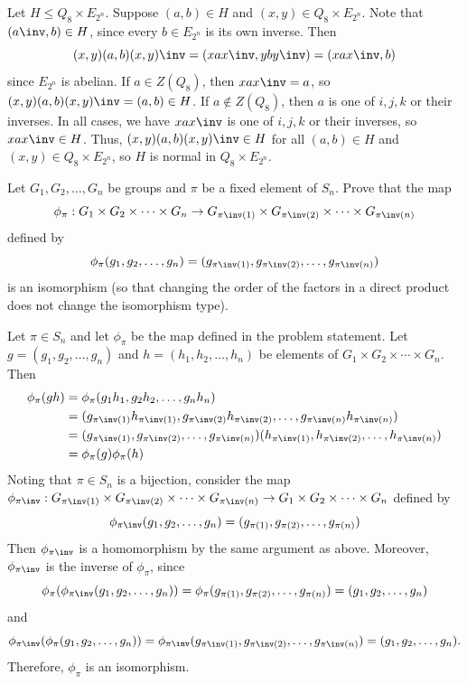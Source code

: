\begin{sol}
    Let $H \leq Q_8 \times E_{2^n}$. Suppose $(a, b) \in H$ and $(x, y) \in Q_8 \times E_{2^n}$. Note that $(a\inv, b) \in H$, since every $b \in E_{2^n}$ is its own inverse. Then
    \[(x, y)(a, b)(x, y)\inv = (xax\inv, yby\inv) = (xax\inv, b)\]
    since $E_{2^n}$ is abelian. If $a \in Z(Q_8)$, then $xax\inv = a$, so $(x, y)(a, b)(x, y)\inv = (a, b) \in H$. If $a \notin Z(Q_8)$, then $a$ is one of $i, j, k$ or their inverses. In all cases, we have $xax\inv$ is one of $i, j, k$ or their inverses, so $xax\inv \in H$. Thus, $(x, y)(a, b)(x, y)\inv \in H$ for all $(a, b) \in H$ and $(x, y) \in Q_8 \times E_{2^n}$, so $H$ is normal in $Q_8 \times E_{2^n}$.
\end{sol}

\begin{exercise}\label{ex5.1.7}
    Let $G_1, G_2, \ldots, G_n$ be groups and $\pi$ be a fixed element of $S_n$. Prove that the map 
    \[\phi_\pi : G_1 \times G_2 \times \cdots \times G_n \to G_{\pi\inv(1)} \times G_{\pi\inv(2)} \times \cdots \times G_{\pi\inv(n)}\]
    defined by
    \[\phi_\pi(g_1, g_2, \ldots, g_n) = (g_{\pi\inv(1)}, g_{\pi\inv(2)}, \ldots, g_{\pi\inv(n)})\]
    is an isomorphism (so that changing the order of the factors in a direct product does not change the isomorphism type).
\end{exercise}

\begin{sol}
    Let $\pi \in S_n$ and let $\phi_\pi$ be the map defined in the problem statement. Let $g = (g_1, g_2, \ldots, g_n)$ and $h = (h_1, h_2, \ldots, h_n)$ be elements of $G_1 \times G_2 \times \cdots \times G_n$. Then
    \begin{align*}
        \phi_\pi(gh) & = \phi_\pi(g_1h_1, g_2h_2, \ldots, g_nh_n) \\
        & = (g_{\pi\inv(1)}h_{\pi\inv(1)}, g_{\pi\inv(2)}h_{\pi\inv(2)}, \ldots, g_{\pi\inv(n)}h_{\pi\inv(n)}) \\
        & = (g_{\pi\inv(1)}, g_{\pi\inv(2)}, \ldots, g_{\pi\inv(n)})(h_{\pi\inv(1)}, h_{\pi\inv(2)}, \ldots, h_{\pi\inv(n)}) \\
        & = \phi_\pi(g)\phi_\pi(h)
    \end{align*}
    Noting that $\pi \in S_n$ is a bijection, consider the map $\phi_{\pi\inv} : G_{\pi\inv(1)} \times G_{\pi\inv(2)} \times \cdots \times G_{\pi\inv(n)} \to G_1 \times G_2 \times \cdots \times G_n$ defined by
    \[\phi_{\pi\inv}(g_1, g_2, \ldots, g_n) = (g_{\pi(1)}, g_{\pi(2)}, \ldots, g_{\pi(n)})\]
    Then $\phi_{\pi\inv}$ is a homomorphism by the same argument as above. Moreover, $\phi_{\pi\inv}$ is the inverse of $\phi_\pi$, since
    \[\phi_\pi(\phi_{\pi\inv}(g_1, g_2, \ldots, g_n)) = \phi_\pi(g_{\pi(1)}, g_{\pi(2)}, \ldots, g_{\pi(n)}) = (g_1, g_2, \ldots, g_n)\]
    and
    \[\phi_{\pi\inv}(\phi_\pi(g_1, g_2, \ldots, g_n)) = \phi_{\pi\inv}(g_{\pi\inv(1)}, g_{\pi\inv(2)}, \ldots, g_{\pi\inv(n)}) = (g_1, g_2, \ldots, g_n).\]
    Therefore, $\phi_\pi$ is an isomorphism.
\end{sol}

